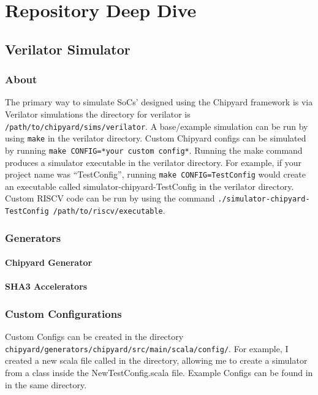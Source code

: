 \chapter{Repository Deep Dive}
\section{Verilator Simulator}
\subsection{About}
The primary way to simulate SoCs' designed using the Chipyard framework is via Verilator simulations the directory for verilator is \texttt{/path/to/chipyard/sims/verilator}.
A base/example simulation can be run by using \texttt{make} in the verilator directory.
Custom Chipyard configs can be simulated by running \texttt{make CONFIG=*your custom config*}.
Running the make command produces a simulator executable in the verilator directory.
For example, if your project name was ``TestConfig'', running \texttt{make CONFIG=TestConfig} would create an executable called simulator-chipyard-TestConfig in the verilator directory.
Custom RISCV code can be run by using the command \texttt{./simulator-chipyard-TestConfig /path/to/riscv/executable}.

\subsection{Generators}
\subsubsection{Chipyard Generator}
\subsubsection{SHA3 Accelerators}

\subsection{Custom Configurations}
Custom Configs can be created in the directory \texttt{chipyard/generators/chipyard/src/main/scala/config/}.
For example, I created a new scala file called  in the directory, allowing me to create a simulator from a class inside the NewTestConfig.scala file.
Example Configs can be found in   in the same directory.

